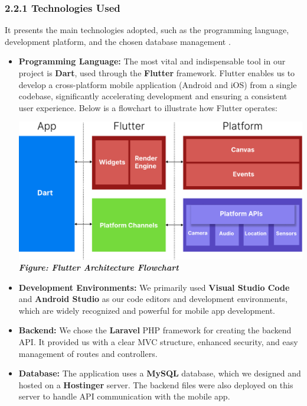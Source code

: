 \documentclass[12pt]{report}
\begin{document}
\subsubsection*{2.2.1 Technologies Used}
It presents the main technologies adopted, such as the programming language, development platform, and the chosen database management .

\begin{itemize}
	\item \textbf{Programming Language:} The most vital and indispensable tool in our project is \textbf{Dart}, used through the \textbf{Flutter} framework. Flutter enables us to develop a cross-platform mobile application (Android and iOS) from a single codebase, significantly accelerating development and ensuring a consistent user experience. Below is a flowchart to illustrate how Flutter operates:
	      \vspace{0.5cm}
	      \begin{center}
		      \includegraphics[width=\linewidth]{images/FlutterDiagram@2x.pdf}
		      \textit{\textbf{Figure: Flutter Architecture Flowchart}}
	      \end{center}


	\item \textbf{Development Environments:} We primarily used \textbf{Visual Studio Code} and \textbf{Android Studio} as our code editors and development environments, which are widely recognized and powerful for mobile app development.

	\item \textbf{Backend:} We chose the \textbf{Laravel} PHP framework for creating the backend API. It provided us with a clear MVC structure, enhanced security, and easy management of routes and controllers.

	\item \textbf{Database:} The application uses a \textbf{MySQL} database, which we designed and hosted on a \textbf{Hostinger} server. The backend files were also deployed on this server to handle API communication with the mobile app.


\end{itemize}
\end{document}
